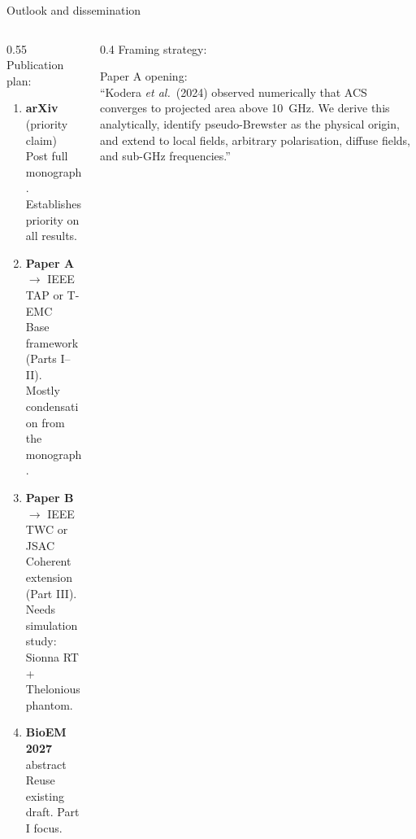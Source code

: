 \begin{frame}{Outlook and dissemination}

  \begin{columns}[T]
    \begin{column}{0.55\textwidth}
      Publication plan:

      \vspace{6pt}
      \begin{enumerate}
        \item \textbf{arXiv} (priority claim)\\
              {\footnotesize Post full monograph. Establishes priority on all results.}

        \vspace{4pt}
        \item \textbf{Paper A} $\rightarrow$ IEEE TAP or T-EMC\\
              {\footnotesize Base framework (Parts I--II).\\
              Mostly condensation from the monograph.}

        \vspace{4pt}
        \item \textbf{Paper B} $\rightarrow$ IEEE TWC or JSAC\\
              {\footnotesize Coherent extension (Part III).\\
              Needs simulation study: Sionna RT + Thelonious phantom.}

        \vspace{4pt}
        \item \textbf{BioEM 2027} abstract\\
              {\footnotesize Reuse existing draft. Part I focus.}
      \end{enumerate}
    \end{column}

    \begin{column}{0.4\textwidth}
      Framing strategy:

      \vspace{6pt}
      {\footnotesize
      Paper A opening:\\
      ``Kodera \textit{et al.}\ (2024) observed numerically that
       ACS converges to projected area above \SI{10}{\giga\hertz}.
       We derive this analytically, identify pseudo-Brewster as
       the physical origin, and extend to local fields, arbitrary
       polarisation, diffuse fields, and sub-GHz frequencies.''
      }


\end{column}
\end{columns}
\end{frame}
